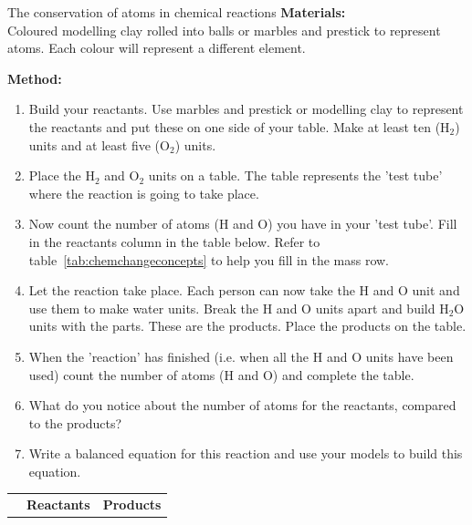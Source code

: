            \begin{activity}{The conservation of atoms in chemical reactions }
            \nopagebreak
            \label{m38711*id64844}\noindent
\textbf{Materials:} \\ Coloured modelling clay rolled into balls or marbles and prestick to represent atoms. Each colour will represent a different element.
        \par 
      \label{m38711*id64882}\noindent
\textbf{Method:}\\
      \label{m38711*id64889}\begin{enumerate}[noitemsep, label=\textbf{\arabic*}. ] 
\label{m38711*uid36}\item Build your reactants. Use marbles and prestick or modelling clay to represent the reactants and put these on one side of your table. Make at least ten ($\text{H}_{2}$) units and at least five ($\text{O}_{2}$) units.
\label{m38711*uid37}\item Place the $\text{H}_{2}$ and $\text{O}_{2}$ units on a table. The table represents the 'test tube' where the reaction is going to take place. 
\label{m38711*uid38}\item Now count the number of atoms ($\text{H}$ and $\text{O}$) you have in your 'test tube'. Fill in the reactants column in the table below. Refer to table~\ref{tab:chemchangeconcepts} to help you fill in the mass row.
\label{m38711*uid39}\item Let the reaction take place. Each person can now take the $\text{H}$ and $\text{O}$ unit and use them to make water units. Break the $\text{H}$ and $\text{O}$ units apart and build $\text{H}_{2}\text{O}$ units with the parts. These are the products. Place the products on the table.
\item When the 'reaction' has finished (i.e. when all the $\text{H}$ and $\text{O}$ units have been used) count the number of atoms ($\text{H}$ and $\text{O}$) and complete the table.
\item What do you notice about the number of atoms for the reactants, compared to the products?
\item Write a balanced equation for this reaction and use your models to build this equation.
\end{enumerate}
        \par 
\begin{table}[H]
 \begin{center}
  \begin{tabular}{|l|l||l|} \hline
& \textbf{Reactants} & \textbf{Products} \\ 

\end{tabular}
\end{center}
\end{table}
\end{activity}
